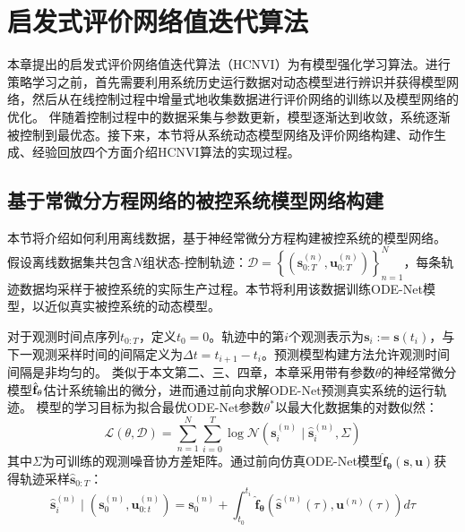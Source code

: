 \section{启发式评价网络值迭代算法}
\label{sec:6_hcnvi}
本章提出的启发式评价网络值迭代算法（HCNVI）为有模型强化学习算法。进行策略学习之前，首先需要利用系统历史运行数据对动态模型进行辨识并获得模型网络，然后从在线控制过程中增量式地收集数据进行评价网络的训练以及模型网络的优化。
伴随着控制过程中的数据采集与参数更新，模型逐渐达到收敛，系统逐渐被控制到最优态。接下来，本节将从系统动态模型网络及评价网络构建、动作生成、经验回放四个方面介绍HCNVI算法的实现过程。
\subsection{基于常微分方程网络的被控系统模型网络构建}
\label{sec:ode_system_modeling}
本节将介绍如何利用离线数据，基于神经常微分方程构建被控系统的模型网络。
假设离线数据集共包含$N$组状态-控制轨迹：$\mathcal{D}=\left\{\left(\mathbf{s}_{0: T}^{(n)}, \mathbf{u}_{0: T}^{(n)}\right)\right\}_{n=1}^{N}$，每条轨迹数据均采样于被控系统的实际生产过程。本节将利用该数据训练ODE-Net模型，以近似真实被控系统的动态模型。

对于观测时间点序列$t_{0:T}$，定义$t_0=0$。轨迹中的第$i$个观测表示为$\mathbf{s}_{i}:=\mathbf{s}\left(t_{i}\right)$，与下一观测采样时间的间隔定义为$\Delta t = t_{i+1}-t_i$。预测模型构建方法允许观测时间间隔是非均匀的。
类似于本文第二、三、四章，本章采用带有参数$\theta$的神经常微分模型$\hat{\mathbf{f}}_\theta$估计系统输出的微分，进而通过前向求解ODE-Net预测真实系统的运行轨迹。
模型的学习目标为拟合最优ODE-Net参数$\theta^*$以最大化数据集的对数似然：
\begin{equation}
\label{equ:likelihood}
    \mathcal{L}(\theta, \mathcal{D})=\sum_{n=1}^{N} \sum_{i=0}^{T} \log \mathcal{N}\left(\mathbf{s}_{i}^{(n)} \mid \hat{\mathbf{s}}_{i}^{(n)}, \Sigma\right)
\end{equation}
其中$\Sigma$为可训练的观测噪音协方差矩阵。通过前向仿真ODE-Net模型$\hat{\mathbf{f}}_{\boldsymbol{\theta}}(\mathbf{s}, \mathbf{u})$获得轨迹采样$\hat{\mathbf{s}}_{0:T}$：
\begin{equation}
\label{equ:state_traj}
\hat{\mathbf{s}}_{i}^{(n)} \mid\left(\mathbf{s}_{0}^{(n)}, \mathbf{u}_{0: t}^{(n)}\right)=\mathbf{s}_{0}^{(n)}+\int_{t_0}^{t_{i}} \hat{\mathbf{f}}_{\boldsymbol{\theta}}\left(\hat{\mathbf{s}}^{(n)}({\tau}), \mathbf{u}^{(n)}(\tau)\right) d \tau
\end{equation}


